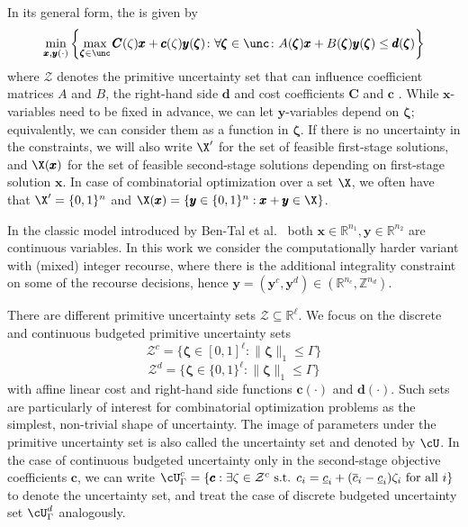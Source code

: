 \documentclass[a4paper,abstracton]{scrartcl}
\begin{document}
In its general form, the  is given by
\[ \min_{\pmb{x},\pmb{y}(\cdot)}  \left\{ \max_{\pmb{\zeta} \in \unc} \pmb{C}(\zeta)\pmb{x} + \pmb{c}(\zeta)\pmb{y}(\pmb{\zeta})  \colon \forall \pmb{\zeta} \in \unc \colon A(\pmb{\zeta}) \pmb{x} + B(\pmb{\zeta})\pmb{y}(\pmb{\zeta}) \leq \pmb{d}(\pmb{\zeta})  \right\} \]
where $\mathcal{Z}$ denotes the primitive uncertainty set that can influence coefficient matrices $A$ and $B$, the right-hand side $\pmb{d}$ and cost coefficients $\pmb{C}$ and $\pmb{c}$ . While $\pmb{x}$-variables need to be fixed in advance, we can let $\pmb{y}$-variables depend on $\pmb{\zeta}$; equivalently, we can consider them as a function in $\pmb{\zeta}$. If there is no uncertainty in the constraints, we will also write $\X'$ for the set of feasible first-stage solutions, and $\X(\pmb{x})$ for the set of feasible second-stage solutions depending on first-stage solution $\pmb{x}$. In case of combinatorial optimization over a set $\X$, we often have that $\X'=\{0,1\}^n$ and $\X(\pmb{x}) = \{ \pmb{y}\in\{0,1\}^n : \pmb{x}+\pmb{y} \in\X\}$.

In the classic model introduced by Ben-Tal et al.~\cite{ben2004adjustable} both $\pmb{x} \in \mathbb{R}^{n_1}, \pmb{y} \in \mathbb{R}^{n_2}$ are continuous variables.
In this work we consider the computationally harder variant with (mixed) integer recourse, where there is the additional integrality constraint on some of the recourse decisions, hence $\pmb{y} = (\pmb{y}^c, \pmb{y}^{d}) \in (\mathbb{R}^{n_c}, \mathbb{Z}^{n_d})$.

There are different primitive uncertainty sets $\mathcal{Z} \subseteq \mathbb{R}^{\ell}$.
We focus on the discrete and continuous budgeted primitive uncertainty sets
\[ \mathcal{Z}^c =  \{ \pmb{\zeta} \in [0,1]^{\ell} \colon \| \pmb{\zeta} \|_1 \leq \Gamma \} \]
\[ \mathcal{Z}^d =  \{ \pmb{\zeta} \in \{0,1\}^{\ell} \colon \| \pmb{\zeta} \|_1 \leq \Gamma \} \]
with affine linear cost and right-hand side functions $\pmb{c}(\cdot)$ and $\pmb{d}(\cdot)$. Such sets are particularly of interest for combinatorial optimization problems as the simplest, non-trivial shape of uncertainty. The image of parameters under the primitive uncertainty set is also called the uncertainty set and denoted by $\cU$. In the case of continuous budgeted uncertainty only in the second-stage objective coefficients $\pmb{c}$, we can write $\cU^c_\Gamma = \{\pmb{c} : \exists \zeta \in \mathcal{Z}^c \text{ s.t. } c_i = \underline{c}_i + (\overline{c}_i - \underline{c}_i)\zeta_i \text{ for all } i\}$ to denote the uncertainty set, and treat the case of discrete budgeted uncertainty set $\cU^d_\Gamma$ analogously.
\end{document}
